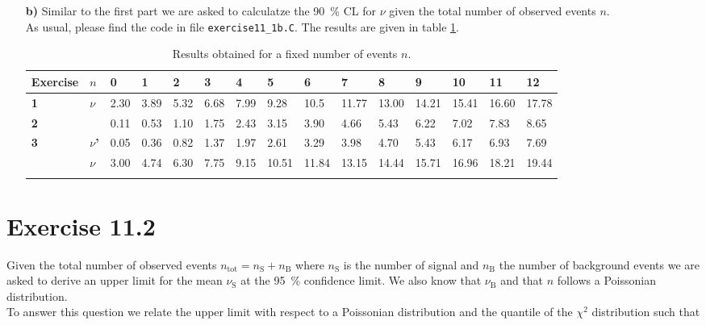 \documentclass[10pt]{article}
\newenvironment{myfont}{\fontfamily{put}\selectfont}{\par}
\begin{document}
\begin{myfont}
\begin{itemize}
	\item[\textbf{b)}] Similar to the first part we are asked to calculatze the \SI{90}{\percent} CL for $\nu$ given the total number of observed events $n$. \\
	As usual, please find the code in file \texttt{exercise11\_1b.C}.
	The results are given in table \ref{tab:ex1_results_b}.
	
	\begin{longtable}{*{15}l}
		\endfirsthead
		\endhead
		\toprule
		\textbf{Exercise} & \textbf{$n$} & 0 & 1 & 2 & 3 & 4 & 5 & 6 & 7 & 8 & 9 & 10 & 11 & 12 \\
		\midrule
		\textbf{1}                  & \multirow{2}{*}{\textbf{$\nu$}} & 2.30 & 3.89 & 5.32 & 6.68 & 7.99 & 9.28 & 10.5 & 11.77 & 13.00 & 14.21 & 15.41 & 16.60 & 17.78 \\ \cline{3-15}
		\textbf{2}                  &                             & 0.11 & 0.53 & 1.10 & 1.75 & 2.43 & 3.15 & 3.90 & 4.66 & 5.43 & 6.22 & 7.02 & 7.83 & 8.65 \\ \cline{2-15}
		\multirow{2}{*}{\textbf{3}} & \textbf{$\nu$'}                 & 0.05 & 0.36 & 0.82 & 1.37 & 1.97 & 2.61 & 3.29 & 3.98 & 4.70 & 5.43 & 6.17 & 6.93 & 7.69 \\ \cline{3-15}
		                            & \textbf{$\nu$}                  & 3.00 & 4.74 & 6.30 & 7.75 & 9.15 & 10.51 & 11.84 & 13.15 & 14.44 & 15.71 & 16.96 & 18.21 & 19.44 \\
		\bottomrule
		\caption[]{Results obtained for a fixed number of events $n$.}
		\label{tab:ex1_results_b}
	\end{longtable}
\end{itemize}

\section*{Exercise 11.2}
\label{sec:11_2}

Given the total number of observed events $n_{\textrm{tot}} = n_{\textrm{S}} + n_{\textrm{B}}$ where $n_{\textrm{S}}$ is the number of signal and $n_{\textrm{B}}$ the number of background events we are asked to derive an upper limit for the mean $\nu_{\textrm{S}}$ at the \SI{95}{\percent} confidence limit.
We also know that $\nu_{\textrm{B}}$ and that $n$ follows a Poissonian distribution. \\
To answer this question we relate the upper limit with respect to a Poissonian distribution and the quantile of the $\chi^{2}$ distribution such that


\end{myfont}
\end{document}
